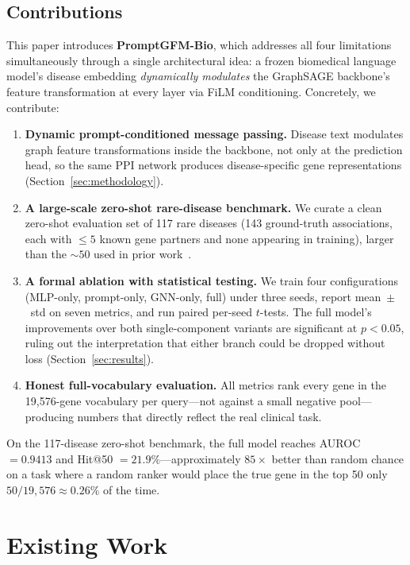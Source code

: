 \documentclass[conference]{IEEEtran}
\begin{document}
\subsection{Contributions}
This paper introduces \textbf{PromptGFM-Bio}, which addresses all four limitations simultaneously through a single architectural idea: a frozen biomedical language model's disease embedding \emph{dynamically modulates} the GraphSAGE backbone's feature transformation at every layer via FiLM conditioning. Concretely, we contribute:

\begin{enumerate}
    \item \textbf{Dynamic prompt-conditioned message passing.} Disease text modulates graph feature transformations inside the backbone, not only at the prediction head, so the same PPI network produces disease-specific gene representations (Section~\ref{sec:methodology}).
    \item \textbf{A large-scale zero-shot rare-disease benchmark.} We curate a clean zero-shot evaluation set of 117 rare diseases (143 ground-truth associations, each with $\leq\!5$ known gene partners and none appearing in training), larger than the $\sim\!\!50$ used in prior work~\cite{shepherd2025}.
    \item \textbf{A formal ablation with statistical testing.} We train four configurations (MLP-only, prompt-only, GNN-only, full) under three seeds, report mean~$\pm$~std on seven metrics, and run paired per-seed $t$-tests. The full model's improvements over both single-component variants are significant at $p<0.05$, ruling out the interpretation that either branch could be dropped without loss (Section~\ref{sec:results}).
    \item \textbf{Honest full-vocabulary evaluation.} All metrics rank every gene in the 19{,}576-gene vocabulary per query---not against a small negative pool---producing numbers that directly reflect the real clinical task.
\end{enumerate}

On the 117-disease zero-shot benchmark, the full model reaches AUROC $= 0.9413$ and Hit@50 $= 21.9\%$---approximately $85\times$ better than random chance on a task where a random ranker would place the true gene in the top 50 only $50/19{,}576 \approx 0.26\%$ of the time.

\section{Existing Work}
\label{sec:existingwork}
\end{document}
